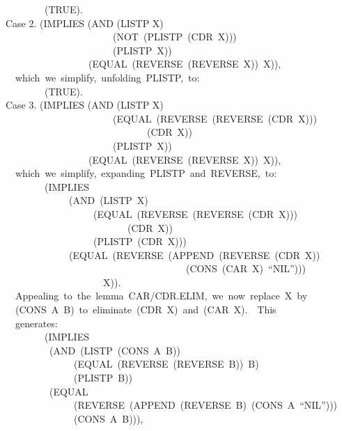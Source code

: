 \documentclass[10pt]{book}
\newenvironment{pubasis}{\begin{flushleft}}{\end{flushleft}}
\begin{document}
\begin{pubasis}
~~~~~~~~(TRUE).\\

Case 2.	(IMPLIES (AND (LISTP X)\\
~~~~~~~~~~~~~~~~~~~~~~(NOT~(PLISTP~(CDR~X)))\\
~~~~~~~~~~~~~~~~~~~~~~(PLISTP~X))\\
~~~~~~~~~~~~~~~~~(EQUAL~(REVERSE~(REVERSE~X))~X)),\\

~~which~we~simplify,~unfolding~PLISTP,~to:\\

~~~~~~~~(TRUE).\\

Case 3.	(IMPLIES (AND (LISTP X)\\
~~~~~~~~~~~~~~~~~~~~~~(EQUAL~(REVERSE~(REVERSE~(CDR~X)))\\
~~~~~~~~~~~~~~~~~~~~~~~~~~~~~(CDR~X))\\
~~~~~~~~~~~~~~~~~~~~~~(PLISTP~X))\\
~~~~~~~~~~~~~~~~~(EQUAL~(REVERSE~(REVERSE~X))~X)),\\

~~which~we~simplify,~expanding~PLISTP~and~REVERSE,~to:\\

~~~~~~~~(IMPLIES\\
~~~~~~~~~~~~~(AND~(LISTP~X)\\
~~~~~~~~~~~~~~~~~~(EQUAL~(REVERSE~(REVERSE~(CDR~X)))\\
~~~~~~~~~~~~~~~~~~~~~~~~~(CDR~X))\\
~~~~~~~~~~~~~~~~~~(PLISTP~(CDR~X)))\\
~~~~~~~~~~~~~(EQUAL~(REVERSE~(APPEND~(REVERSE~(CDR~X))\\
~~~~~~~~~~~~~~~~~~~~~~~~~~~~~~~~~~~~~(CONS~(CAR~X)~``NIL'')))\\
~~~~~~~~~~~~~~~~~~~~X)).\\

~~Appealing~to~the~lemma~CAR/CDR.ELIM,~we~now~replace~X~by\\
~~(CONS~A~B)~to~eliminate~(CDR~X)~and~(CAR~X).~~This\\
~~generates:\\

~~~~~~~~(IMPLIES\\
~~~~~~~~~(AND~(LISTP~(CONS~A~B))\\
~~~~~~~~~~~~~~(EQUAL~(REVERSE~(REVERSE~B))~B)\\
~~~~~~~~~~~~~~(PLISTP~B))\\
~~~~~~~~~(EQUAL\\
~~~~~~~~~~~~~~(REVERSE~(APPEND~(REVERSE~B)~(CONS~A~``NIL'')))\\
~~~~~~~~~~~~~~(CONS~A~B))),\\


\end{pubasis}
\end{document}
